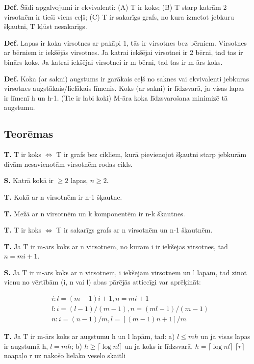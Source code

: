 \documentclass{article}
\begin{document}
\textbf{Def.}  Šādi apgalvojumi ir ekvivalenti: (A) T ir koks; (B) T starp katrām 2 virsotnēm ir tieši viens ceļš; (C) T ir sakarīgs grafs, no kura izmetot jebkuru šķautni, T kļūst nesakarīgs. 

\textbf{Def.}  Lapas ir koka virsotnes ar pakāpi 1, tās ir virsotnes bez bērniem.  Virsotnes ar bērniem ir iekšējās virsotnes.  Ja katrai iekšējai virsotnei ir 2 bērni, tad tas ir binārs koks.  Ja katrai iekšējai virsotnei ir m bērni, tad tas ir m-ārs koks.

\textbf{Def.}  Koka (ar sakni) augstums ir garākais ceļš no saknes vai ekvivalenti jebkuras virsotnes augstākais/lielākais līmenis.  Koks (ar sakni) ir līdzsvarā, ja visas lapas ir līmenī h un h-1. (Tie ir labi koki) M-āra koka līdzsvarošana minimizē tā augstumu.

\subsection{Teorēmas}

\textbf{T. } T ir koks $\Leftrightarrow$ T ir grafs bez cikliem, kurā pievienojot šķautni starp jebkurām divām nesavienotām virsotnēm rodas cikls.

\textbf{S. } Katrā kokā ir $\ge 2$ lapas, $n \ge 2$.

\textbf{T. } Kokā ar n virsotnēm ir n-1 šķautne.

\textbf{T. } Mežā ar n virsotnēm un k komponentēm ir n-k šķautnes.

\textbf{T. } T ir koks $⇔$ T ir sakarīgs grafs ar n virsotnēm un n-1 šķautnēm.

\textbf{T. } Ja T ir m-ārs koks ar n virsotnēm, no kurām i ir iekšējās virsotnes, tad $n = mi + 1$.

\textbf{S. } Ja T ir m-ārs koks ar n virsotnēm, i iekšējām virsotnēm un l lapām, tad zinot vienu no vērtībām (i, n vai l) abas pārējās attiecīgi var aprēķināt:

\begin{align}
		&i : l = (m − 1)i + 1, n = mi + 1\\
		&l : i = (l − 1)/(m − 1), n = (ml − 1)/(m − 1)\\
		&n : i = (n − 1)/m, l = [(m − 1)n + 1]/m
\end{align}

\textbf{T. } Ja T ir m-ārs koks ar augstumu h un l lapām, tad: a) $l \le mh$ un ja visas lapas ir augstumā h, $l = mh$; b) $h \ge \lceil \log{n}l \rceil$ un ja koks ir līdzsvarā, $h =\lceil \log{n}l \rceil$
$\lceil r \rceil$ noapaļo r uz nākošo lielāko veselo skaitli
\end{document}
